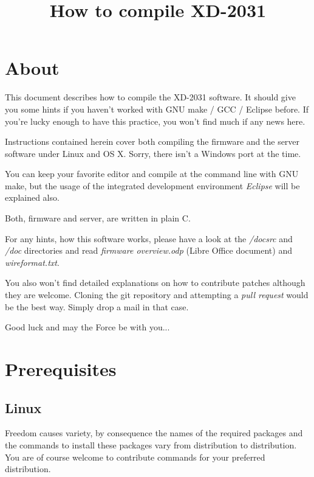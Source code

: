 




\newcommand{\screenshot}[2][scale=0.5]{ 
	\begin{center} 
	\includegraphics [ #1 ] {images/#2} 
	\end{center}  
}

\newcommand{\clickhere}[1]{\textit{#1}}
\newcommand{\typethis}[1]{\textbf{#1}}

\title{How to compile XD-2031}
\author{}
\maketitle
\clearpage

\tableofcontents
\clearpage

\section{About}
This document describes how to compile the XD-2031 software. 
It should give you some hints if you haven't worked with 
GNU make / GCC / Eclipse
before. If you're lucky enough to have this practice, you won't find
much if any news here.

Instructions contained herein cover both compiling the firmware and the
server software under Linux and OS X. Sorry, there isn't a Windows port 
at the time.

You can keep your favorite editor and compile at the command line with 
GNU make, but the usage of the integrated development environment 
\textit{Eclipse} will be explained also.

Both, firmware and server, are written in plain C.

For any hints, how this software works,
please have a look at the \textit{/docsrc} 
and \textit{/doc} directories and read \textit{firmware overview.odp} 
(Libre Office document) and \textit{wireformat.txt}.

You also won't find detailed explanations on how to contribute patches although
they are welcome. Cloning the git repository and attempting a 
\textit{pull request} would be the best way. Simply drop a mail in that case.

Good luck and may the Force be with you...

\section{Prerequisites}

\subsection{Linux}
Freedom causes variety, by consequence the names of the required packages 
and the commands to install these packages vary from distribution 
to distribution.
You are of course welcome to contribute commands for your preferred distribution. 

